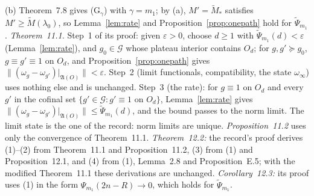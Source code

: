 \documentclass[11pt,a4paper]{article}
\newcommand{\A}{\mathfrak{A}}
\newcommand{\G}{\mathcal{G}}
\newcommand{\Mt}{\widetilde M}                %
\newcommand{\Psit}{\widetilde\Psi}
\theoremstyle{plain}
\theoremstyle{definition}
\begin{document}
(b) Theorem~7.8 gives (G$_\gamma$) with $\gamma=m_1$; by (a), $M'=\Mt_*$ satisfies
$M'\ge\Mt(\lambda_0)$, so Lemma~\ref{lem:rate} and Proposition~\ref{prop:onepath} hold for
$\Psit_{m_1}$.  \emph{Theorem~11.1.}  Step~1 of its proof: given $\varepsilon>0$, choose $d\ge1$
with $\Psit_{m_1}(d)<\varepsilon$ (Lemma~\ref{lem:rate}), and $g_0\in\G$ whose plateau interior
contains $O_d$; for $g,g'\succcurlyeq g_0$, $g\equiv g'\equiv1$ on $O_d$, and
Proposition~\ref{prop:onepath} gives $\|(\omega_g-\omega_{g'})|_{\A(O)}\|<\varepsilon$.  Step~2
(limit functionals, compatibility, the state $\omega_\infty$) uses nothing else and is
unchanged.  Step~3 (the rate): for $g\equiv1$ on $O_d$ and every $g'$ in the cofinal set
$\{g'\in\G:g'\equiv1\text{ on }O_d\}$, Lemma~\ref{lem:rate} gives
$\|(\omega_g-\omega_{g'})|_{\A(O)}\|\le\Psit_{m_1}(d)$, and the bound passes to the norm limit.
The limit state is the one of the record: norm limits are unique.  \emph{Proposition~11.2} uses
only the convergence of Theorem~11.1.  \emph{Theorem~12.2:} the record's proof derives (1)--(2)
from Theorem~11.1 and Proposition~11.2, (3) from (1) and Proposition~12.1, and (4) from (1),
Lemma~2.8 and Proposition~E.5; with the modified Theorem~11.1 these derivations are unchanged.
\emph{Corollary~12.3:} its proof uses (1) in the form $\Psi_{m_1}(2n-R)\to0$, which holds for
$\Psit_{m_1}$.
\end{document}

